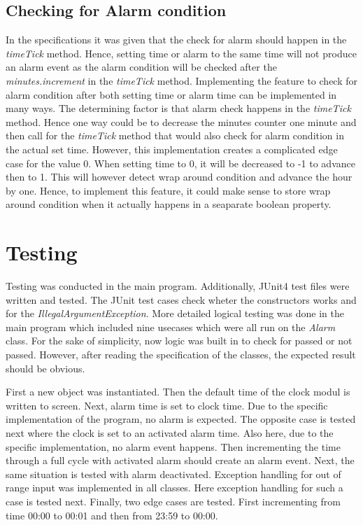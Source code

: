 \documentclass[a4paper,11pt,twoside]{article}
\begin{document}
\subsection{Checking for Alarm condition}
In the specifications it was given that the check for alarm should
happen in the \textit{timeTick} method. Hence, setting time or alarm
to the same time will not produce an alarm event as the alarm
condition will be checked after the \textit{minutes.increment} in the
\textit{timeTick} method. Implementing the feature to check for alarm
condition after both setting time or alarm time can be implemented in
many ways. The determining factor is that alarm check happens in the
\textit{timeTick} method. Hence one way could be to decrease the
minutes counter one minute and then call for the \textit{timeTick}
method that would also check for alarm condition in the actual set
time. However, this implementation creates a complicated edge case for
the value 0. When setting time to 0, it will be decreased to -1 to
advance then to 1. This will however detect wrap around condition and
advance the hour by one. Hence, to implement this feature, it could
make sense to store wrap around condition when it actually happens in
a seaparate boolean property. 

 
\section{Testing}
Testing was conducted in the main program. Additionally, JUnit4 test
files were written and tested. The JUnit test cases check wheter the
constructors works and for the \textit{IllegalArgumentException}. More
detailed logical testing was done in the main program which 
included nine usecases which were all run on the \textit{Alarm}
class. For the sake of simplicity, now logic was built in to check for
passed or not passed. However, after reading the specification of the
classes, the expected result should be obvious.

First a new object was instantiated. Then the default time of the
clock modul is written to screen. Next, alarm time is set to clock
time. Due to the specific implementation of the program, no alarm is
expected. The opposite case is tested next where the clock is set to
an activated alarm time. Also here, due to the specific
implementation, no alarm event happens. Then incrementing the time
through a full cycle with activated alarm should create an alarm
event. Next, the same situation is tested with alarm deactivated.
Exception handling for out of range input was implemented in all
classes. Here exception handling for such a case is tested next.
Finally, two edge cases are tested. First incrementing from time 00:00
to 00:01 and then from 23:59 to 00:00. 




\end{document}
